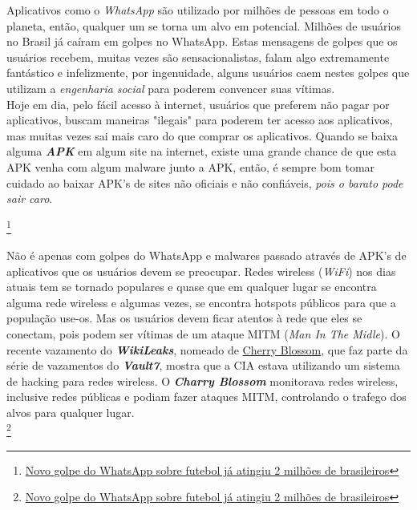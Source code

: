 \documentclass[12pt, letterpaper, Monospace:12]{report}
\begin{document}
	Aplicativos como o \textit{WhatsApp} são utilizado por milhões de pessoas em todo o planeta, então, qualquer um se torna um alvo em potencial. Milhões de usuários no Brasil já caíram em golpes no WhatsApp. Estas mensagens de golpes que os usuários recebem, muitas vezes são sensacionalistas, falam algo extremamente fantástico e infelizmente, por ingenuidade, alguns usuários caem nestes golpes que utilizam a \textit{engenharia social} para poderem convencer suas vítimas.\\

	Hoje em dia, pelo fácil acesso à internet, usuários que preferem não pagar por aplicativos, buscam maneiras "ilegais" para poderem ter acesso aos aplicativos, mas muitas vezes sai mais caro do que comprar os aplicativos. Quando se baixa alguma \textbf{\textit{APK}} em algum site na internet, existe uma grande chance de que esta APK venha com algum malware junto a APK, então, é sempre bom tomar cuidado ao baixar APK's de sites não oficiais e não confiáveis, \textit{pois o barato pode sair caro}.


\footnote{\href{https://www.tecmundo.com.br/whatsapp/116247-novo-golpe-whatsapp-futebol-atingiu-2-milhoes-brasileiros.htm}{Novo golpe do WhatsApp sobre futebol já atingiu 2 milhões de brasileiros}}

	Não é apenas com golpes do WhatsApp e malwares passado através de APK's de aplicativos que os usuários devem se preocupar. Redes wireless (\textit{WiFi}) nos dias atuais tem se tornado populares e quase que em qualquer lugar se encontra alguma rede wireless e algumas vezes, se encontra hotspots públicos para que a população use-os. Mas os usuários devem ficar atentos à rede que eles se conectam, pois podem ser vítimas de um ataque MITM (\textit{Man In The Midle}). O recente vazamento do \textbf{\textit{WikiLeaks}}, nomeado de \href{https://wikileaks.org/vault7/#Cherry\%20Blossom}{Cherry Blossom}, que faz parte da série de vazamentos do \textit{\textbf{Vault7}}, mostra que a CIA estava utilizando um sistema de hacking para redes wireless. O \textbf{\textit{Charry Blossom}} monitorava redes wireless, inclusive redes públicas e podiam fazer ataques MITM, controlando o trafego dos alvos para qualquer lugar.\\

\footnote{\href{https://www.tecmundo.com.br/whatsapp/116247-novo-golpe-whatsapp-futebol-atingiu-2-milhoes-brasileiros.htm}{Novo golpe do WhatsApp sobre futebol já atingiu 2 milhões de brasileiros}}

\pagebreak
\end{document}
